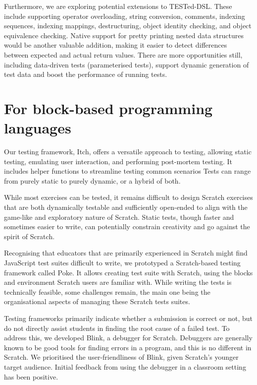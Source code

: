 \documentclass[main]{subfiles}
\begin{document}
Furthermore, we are exploring potential extensions to TESTed-DSL\@.
These include supporting operator overloading, string conversion, comments, indexing sequences, indexing mappings, destructuring, object identity checking, and object equivalence checking.
Native support for pretty printing nested data structures would be another valuable addition, making it easier to detect differences between expected and actual return values.
There are more opportunities still, including data-driven tests (parameterised tests), support dynamic generation of test data and boost the performance of running tests.

\section{For block-based programming languages}\label{sec:for-block-based-programming-languages}

Our testing framework, Itch, offers a versatile approach to testing, allowing static testing, emulating user interaction, and performing post-mortem testing.
It includes helper functions to streamline testing common scenarios
Tests can range from purely static to purely dynamic, or a hybrid of both.

While most exercises can be tested, it remains difficult to design Scratch exercises that are both dynamically testable and sufficiently open-ended to align with the game-like and exploratory nature of Scratch.
Static tests, though faster and sometimes easier to write, can potentially constrain creativity and go against the spirit of Scratch.

Recognising that educators that are primarily experienced in Scratch might find JavaScript test suites difficult to write, we prototyped a Scratch-based testing framework called Poke.
It allows creating test suite with Scratch, using the blocks and environment Scratch users are familiar with.
While writing the tests is technically feasible, some challenges remain, the main one being the organisational aspects of managing these Scratch tests suites.

Testing frameworks primarily indicate whether a submission is correct or not, but do not directly assist students in finding the root cause of a failed test.
To address this, we developed Blink, a debugger for Scratch.
Debuggers are generally known to be good tools for finding errors in a program, and this is no different in Scratch.
We prioritised the user-friendliness of Blink, given Scratch's younger target audience.
Initial feedback from using the debugger in a classroom setting has been positive.
\end{document}
